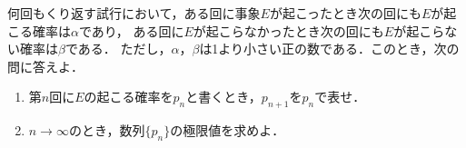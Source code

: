 \documentclass[../../main.tex]{subfiles}
\begin{document}
何回もくり返す試行において，ある回に事象$E$が起こったとき次の回にも$E$が起こる確率は$\alpha$であり，
ある回に$E$が起こらなかったとき次の回にも$E$が起こらない確率は$\beta$である．
ただし，$\alpha$，$\beta$は1より小さい正の数である．このとき，次の問に答えよ．
\begin{enumerate}
  \item 第$n$回に$E$の起こる確率を$p_n$と書くとき，$p_{n+1}$を$p_n$で表せ．
  \item $n\to\infty$のとき，数列$\{ p_n \}$の極限値を求めよ．
\end{enumerate}
\end{document}
